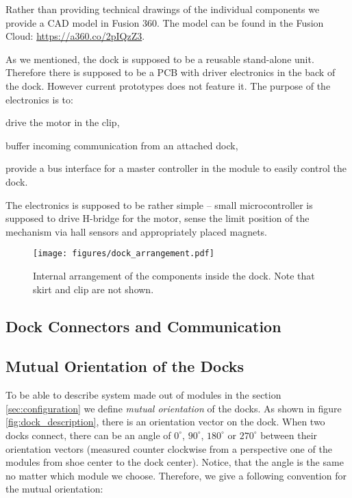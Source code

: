 Rather than providing technical drawings of the individual components we provide
a CAD model in Fusion 360. The model can be found in the Fusion Cloud:
\url{https://a360.co/2pIQzZ3}.

As we mentioned, the dock is supposed to be a reusable stand-alone unit.
Therefore there is supposed to be a PCB with driver electronics in the back of
the dock. However current prototypes does not feature it. The purpose of the
electronics is to:
\begin{enumerate*}
    \item drive the motor in the clip,
    \item buffer incoming communication from an attached dock,
    \item provide a bus interface for a master controller in the module to
    easily control the dock.
\end{enumerate*}
The electronics is supposed to be rather simple -- small microcontroller is
supposed to drive H-bridge for the motor, sense the limit position of the
mechanism via hall sensors and appropriately placed magnets.

\begin{figure}
    \centering
    \texttt{[image: figures/dock\_arrangement.pdf]}
    \caption{Internal arrangement of the components inside the dock. Note that
    skirt and clip are not shown.}
    \label{fig:dock_internal_arrangement}
\end{figure}

\subsection{Dock Connectors and Communication}


\subsection{Mutual Orientation of the Docks}\label{sec:mutual_orientation}

To be able to describe system made out of modules in the section
\ref{sec:configuration} we define \emph{mutual orientation} of the docks. As
shown in figure \ref{fig:dock_description}, there is an orientation vector on
the dock. When two docks connect, there can be an angle of $0^\circ$,
$90^\circ$, $180^\circ$ or $270^\circ$ between their orientation vectors
(measured counter clockwise from a perspective one of the modules from shoe
center to the dock center). Notice, that the angle is the same no matter which
module we choose. Therefore, we give a following convention for the mutual
orientation:

